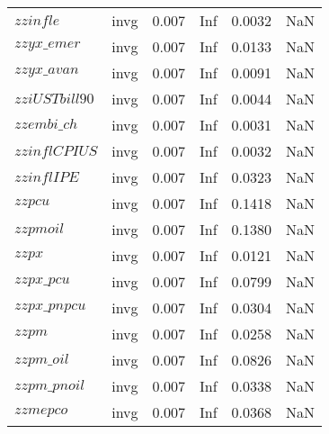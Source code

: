 \begin{center}
\begin{longtable}{llcccc}
$zzinfle$ & invg &   0.007 &    Inf &   0.0032 &     NaN \\ 
$zzyx\_emer$ & invg &   0.007 &    Inf &   0.0133 &     NaN \\ 
$zzyx\_avan$ & invg &   0.007 &    Inf &   0.0091 &     NaN \\ 
$zziUSTbill90$ & invg &   0.007 &    Inf &   0.0044 &     NaN \\ 
$zzembi\_ch$ & invg &   0.007 &    Inf &   0.0031 &     NaN \\ 
$zzinflCPIUS$ & invg &   0.007 &    Inf &   0.0032 &     NaN \\ 
$zzinflIPE$ & invg &   0.007 &    Inf &   0.0323 &     NaN \\ 
$zzpcu$ & invg &   0.007 &    Inf &   0.1418 &     NaN \\ 
$zzpmoil$ & invg &   0.007 &    Inf &   0.1380 &     NaN \\ 
$zzpx$ & invg &   0.007 &    Inf &   0.0121 &     NaN \\ 
$zzpx\_pcu$ & invg &   0.007 &    Inf &   0.0799 &     NaN \\ 
$zzpx\_pnpcu$ & invg &   0.007 &    Inf &   0.0304 &     NaN \\ 
$zzpm$ & invg &   0.007 &    Inf &   0.0258 &     NaN \\ 
$zzpm\_oil$ & invg &   0.007 &    Inf &   0.0826 &     NaN \\ 
$zzpm\_pnoil$ & invg &   0.007 &    Inf &   0.0338 &     NaN \\ 
$zzmepco$ & invg &   0.007 &    Inf &   0.0368 &     NaN \\ 
\end{longtable}
 \end{center}

